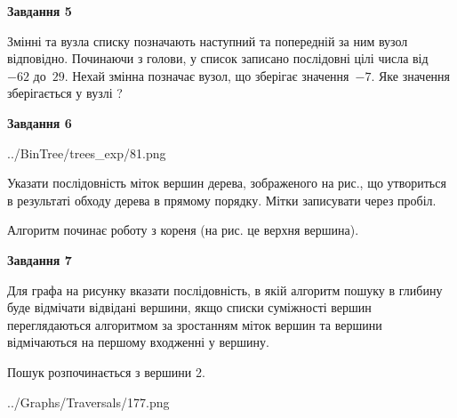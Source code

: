 \documentclass[12pt, ukrainian]{article}
\begin{document}
{\begin {large}
{\begin {center}\textbf{Завдання 5}\end {center}}\par
Змінні  та  вузла списку позначають наступний та попередній за ним вузол відповідно. Починаючи з голови, у список записано послідовні цілі числа від~$-62$ до~$29$. Нехай змінна  позначає вузол, що зберігає значення~$-7$.
Яке значення зберігається у вузлі  ?\par
\newpage

{\begin {center}\textbf{Завдання 6}\end {center}}\par

\begin{center}
	{../BinTree/trees_exp/81.png}
\end{center}
Указати послідовність міток вершин дерева, зображеного на рис., що утвориться в результаті обходу дерева в прямому порядку. Мітки записувати через пробіл.\par Алгоритм починає роботу з кореня (на рис. це верхня вершина).\par
\newpage

{\begin {center}\textbf{Завдання 7}\end {center}}\par
Для графа на рисунку вказати послідовність, в якій алгоритм пошуку в глибину буде відмічати відвідані вершини, якщо списки суміжності вершин переглядаються алгоритмом за зростанням міток вершин та вершини відмічаються на першому вход\-женні у вершину.\par
Пошук розпочинається з вершини 2.\par

\begin{center}
	{../Graphs/Traversals/177.png}
\end{center}\par
\newpage


\end{large}}
\end{document}

